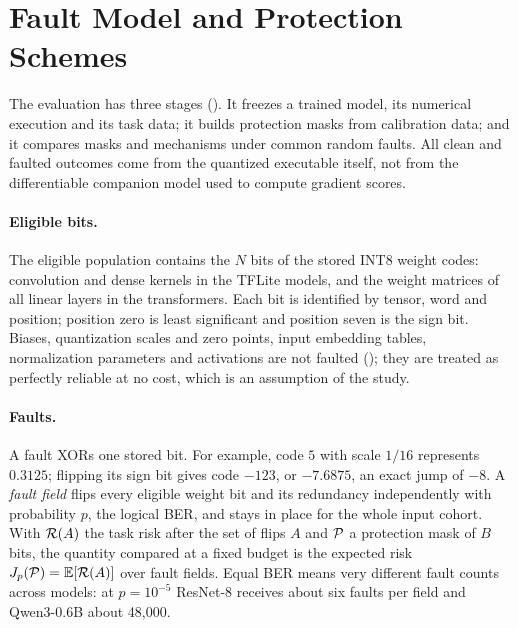 \section{Fault Model and Protection Schemes}\label{sec:fault}
The evaluation has three stages (). It freezes a trained model, its numerical execution and its task data; it builds protection masks from calibration data; and it compares masks and mechanisms under common random faults. All clean and faulted outcomes come from the quantized executable itself, not from the differentiable companion model used to compute gradient scores.

\paragraph{Eligible bits.} The eligible population contains the $N$ bits of the stored INT8 weight codes: convolution and dense kernels in the TFLite models, and the weight matrices of all linear layers in the transformers. Each bit is identified by tensor, word and position; position zero is least significant and position seven is the sign bit. Biases, quantization scales and zero points, input embedding tables, normalization parameters and activations are not faulted (); they are treated as perfectly reliable at no cost, which is an assumption of the study.

\paragraph{Faults.} A fault XORs one stored bit. For example, code $5$ with scale $1/16$ represents $0.3125$; flipping its sign bit gives code $-123$, or $-7.6875$, an exact jump of $-8$. A \emph{fault field} flips every eligible weight bit and its redundancy independently with probability $p$, the logical BER, and stays in place for the whole input cohort. With $\mathcal{R}(A)$ the task risk after the set of flips $A$ and $\mathcal{P}$ a protection mask of $B$ bits, the quantity compared at a fixed budget is the expected risk $J_p(\mathcal{P})=\mathbb{E}[\mathcal{R}(A)]$ over fault fields. Equal BER means very different fault counts across models: at $p=10^{-5}$ ResNet-8 receives about six faults per field and Qwen3-0.6B about 48{,}000.

